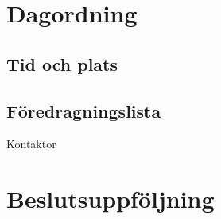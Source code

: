 \documentclass[10pt]{article}
\def\sekr{Erik Månsson}
\begin{document}
\firstpage

\tableofcontents
\newpage


\newpage

\section{Dagordning}
\subsection{Tid och plats}
\tidplats

\subsection{Föredragningslista}
\begin{paragrafer}

\end{paragrafer}

\begin{signatures}{1}
\ist
\signature{\sekr}{Kontaktor}
\end{signatures}

\section{Beslutsuppföljning}
\begin{busek}
\end{busek}

\begin{utskottsrapporter}
    
\end{utskottsrapporter}

\begin{valforslags}
    
\end{valforslags}

\begin{berattelser}
    
\end{berattelser}

\begin{stadgeandringar}
    
\end{stadgeandringar}

\begin{motioner}
    
    
\end{motioner}

\begin{propositioner}
    
\end{propositioner}
\end{document}
